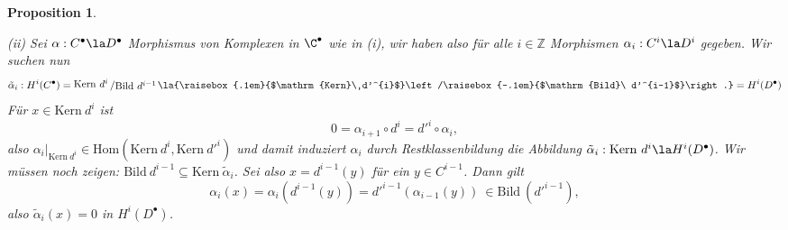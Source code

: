 \documentclass[11pt]{book}
\newtheorem{proposition}[theorem]{Proposition}
\theoremstyle{nonumberbreak}
\newenvironment{pr}[1][]{\ifthenelse{\equal{#1}{}}{\proof}{\proof[#1]}\rm}{\endproof}
\newcommand{\Hom}{\mathrm{Hom} }
\newcommand{\bild}{\mathrm{Bild}\ }
\newcommand{\kernel}{\mathrm{Kern}\ }
\newcommand{\slant}[2]{{\raisebox{.1em}{$#1$}\left/\raisebox{-.1em}{$#2$}\right.}}
\begin{document}
\begin{spacing}{1.4}
\begin{proposition}
\begin{compactenum}
\end{compactenum}

\begin{pr}
\begin{compactenum}
\item[(ii)] Sei $\alpha: C^{\bullet} \la D^{\bullet}$ Morphismus von Komplexen in $\C^{\bullet}$ wie in (i), wir haben also für alle $i \in \mathbb{Z}$ Morphismen $\alpha_i: C^{i} \la D^{i}$ gegeben. Wir suchen nun 
$$\tilde{\alpha}_i: H^{i}(C^{\bullet}) = \slant{\kernel d^{i}}{\bild d^{i-1}}  \la \slant{\kernel d'^{i}}{\bild d'^{i-1}} = H^{i}(D^{\bullet})$$
Für $x \in \kernel d^{i}$ ist 
$$0 = \alpha_{i+1} \circ d^{i} = d'^{i} \circ \alpha_i,$$
also $\alpha_i \vert_{\kernel d^{i}} \in \Hom \left( \kernel d^{i}, \kernel d'^{i}\right)$ und damit induziert $\alpha_i$ durch Restklassenbildung die Abbildung $\tilde{\alpha}_i: \kernel d^{i} \la H^{i}(D^{\bullet})$. Wir müssen noch zeigen: $\bild d^{i-1} \subseteq \kernel \tilde{\alpha}_i$. Sei also $x = d^{i-1}(y)$ für ein $y \in C^{i-1}$. Dann gilt 
$$\alpha_i(x) = \alpha_i(d^{i-1}(y)) = d'^{i-1}(\alpha_{i-1}(y)) \ \in \bild (d'^{i-1}),$$
also $\tilde{\alpha}_i(x) = 0$ in $H^{i}(D^{\bullet})$.


\end{compactenum}
\end{pr}
\end{proposition}
\end{spacing}
\end{document}
